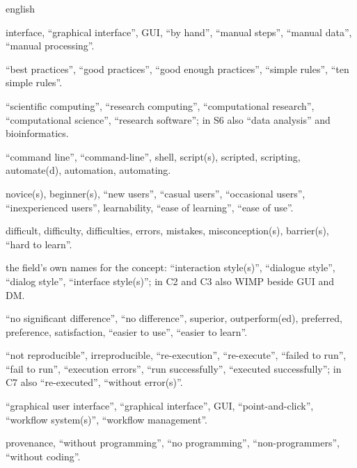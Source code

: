 \begin{onlyin}{english}
\begin{description}
{    interface}, \enquote{graphical interface}, GUI, \enquote{by hand},
    \enquote{manual steps}, \enquote{manual data}, \enquote{manual
    processing}.
  \item[ADV] \enquote{best practices}, \enquote{good practices},
    \enquote{good enough practices}, \enquote{simple rules},
    \enquote{ten simple rules}.
  \item[RES] \enquote{scientific computing}, \enquote{research
    computing}, \enquote{computational research}, \enquote{computational
    science}, \enquote{research software}; in S6 also \enquote{data
    analysis} and bioinformatics.
  \item[AUT] \enquote{command line}, \enquote{command-line}, shell,
    script(s), scripted, scripting, automate(d), automation, automating.
  \item[NOV] novice(s), beginner(s), \enquote{new users},
    \enquote{casual users}, \enquote{occasional users},
    \enquote{inexperienced users}, learnability, \enquote{ease of
    learning}, \enquote{ease of use}.
  \item[DIF] difficult, difficulty, difficulties, errors, mistakes,
    misconception(s), barrier(s), \enquote{hard to learn}.
  \item[STYLE] the field's own names for the concept:
    \enquote{interaction style(s)}, \enquote{dialogue style},
    \enquote{dialog style}, \enquote{interface style(s)}; in C2 and C3
    also WIMP beside GUI and DM.
  \item[NEG] \enquote{no significant difference}, \enquote{no
    difference}, superior, outperform(ed), preferred, preference,
    satisfaction, \enquote{easier to use}, \enquote{easier to learn}.
  \item[FAIL] \enquote{not reproducible}, irreproducible,
    \enquote{re-execution}, \enquote{re-execute}, \enquote{failed to
    run}, \enquote{fail to run}, \enquote{execution errors},
    \enquote{run successfully}, \enquote{executed successfully}; in C7
    also \enquote{re-executed}, \enquote{without error(s)}.
  \item[GREP] \enquote{graphical user interface}, \enquote{graphical
    interface}, GUI, \enquote{point-and-click}, \enquote{workflow
    system(s)}, \enquote{workflow management}.
  \item[PROV] provenance, \enquote{without programming}, \enquote{no
    programming}, \enquote{non-programmers}, \enquote{without coding}.
\end{description}
\par\endgroup

\end{onlyin}
